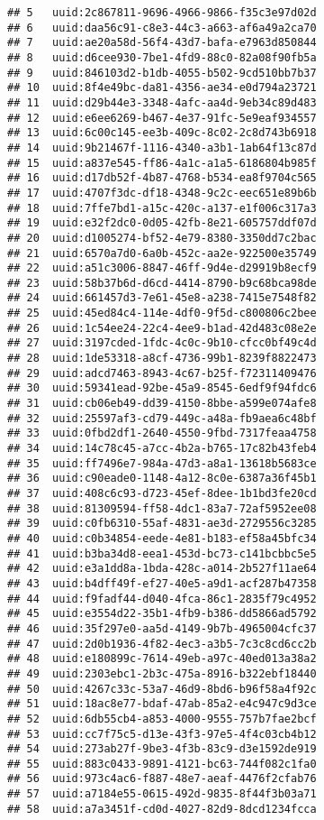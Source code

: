 \documentclass[
]{article}
\begin{document}
\begin{verbatim}
## 5   uuid:2c867811-9696-4966-9866-f35c3e97d02d
## 6   uuid:daa56c91-c8e3-44c3-a663-af6a49a2ca70
## 7   uuid:ae20a58d-56f4-43d7-bafa-e7963d850844
## 8   uuid:d6cee930-7be1-4fd9-88c0-82a08f90fb5a
## 9   uuid:846103d2-b1db-4055-b502-9cd510bb7b37
## 10  uuid:8f4e49bc-da81-4356-ae34-e0d794a23721
## 11  uuid:d29b44e3-3348-4afc-aa4d-9eb34c89d483
## 12  uuid:e6ee6269-b467-4e37-91fc-5e9eaf934557
## 13  uuid:6c00c145-ee3b-409c-8c02-2c8d743b6918
## 14  uuid:9b21467f-1116-4340-a3b1-1ab64f13c87d
## 15  uuid:a837e545-ff86-4a1c-a1a5-6186804b985f
## 16  uuid:d17db52f-4b87-4768-b534-ea8f9704c565
## 17  uuid:4707f3dc-df18-4348-9c2c-eec651e89b6b
## 18  uuid:7ffe7bd1-a15c-420c-a137-e1f006c317a3
## 19  uuid:e32f2dc0-0d05-42fb-8e21-605757ddf07d
## 20  uuid:d1005274-bf52-4e79-8380-3350dd7c2bac
## 21  uuid:6570a7d0-6a0b-452c-aa2e-922500e35749
## 22  uuid:a51c3006-8847-46ff-9d4e-d29919b8ecf9
## 23  uuid:58b37b6d-d6cd-4414-8790-b9c68bca98de
## 24  uuid:661457d3-7e61-45e8-a238-7415e7548f82
## 25  uuid:45ed84c4-114e-4df0-9f5d-c800806c2bee
## 26  uuid:1c54ee24-22c4-4ee9-b1ad-42d483c08e2e
## 27  uuid:3197cded-1fdc-4c0c-9b10-cfcc0bf49c4d
## 28  uuid:1de53318-a8cf-4736-99b1-8239f8822473
## 29  uuid:adcd7463-8943-4c67-b25f-f72311409476
## 30  uuid:59341ead-92be-45a9-8545-6edf9f94fdc6
## 31  uuid:cb06eb49-dd39-4150-8bbe-a599e074afe8
## 32  uuid:25597af3-cd79-449c-a48a-fb9aea6c48bf
## 33  uuid:0fbd2df1-2640-4550-9fbd-7317feaa4758
## 34  uuid:14c78c45-a7cc-4b2a-b765-17c82b43feb4
## 35  uuid:ff7496e7-984a-47d3-a8a1-13618b5683ce
## 36  uuid:c90eade0-1148-4a12-8c0e-6387a36f45b1
## 37  uuid:408c6c93-d723-45ef-8dee-1b1bd3fe20cd
## 38  uuid:81309594-ff58-4dc1-83a7-72af5952ee08
## 39  uuid:c0fb6310-55af-4831-ae3d-2729556c3285
## 40  uuid:c0b34854-eede-4e81-b183-ef58a45bfc34
## 41  uuid:b3ba34d8-eea1-453d-bc73-c141bcbbc5e5
## 42  uuid:e3a1dd8a-1bda-428c-a014-2b527f11ae64
## 43  uuid:b4dff49f-ef27-40e5-a9d1-acf287b47358
## 44  uuid:f9fadf44-d040-4fca-86c1-2835f79c4952
## 45  uuid:e3554d22-35b1-4fb9-b386-dd5866ad5792
## 46  uuid:35f297e0-aa5d-4149-9b7b-4965004cfc37
## 47  uuid:2d0b1936-4f82-4ec3-a3b5-7c3c8cd6cc2b
## 48  uuid:e180899c-7614-49eb-a97c-40ed013a38a2
## 49  uuid:2303ebc1-2b3c-475a-8916-b322ebf18440
## 50  uuid:4267c33c-53a7-46d9-8bd6-b96f58a4f92c
## 51  uuid:18ac8e77-bdaf-47ab-85a2-e4c947c9d3ce
## 52  uuid:6db55cb4-a853-4000-9555-757b7fae2bcf
## 53  uuid:cc7f75c5-d13e-43f3-97e5-4f4c03cb4b12
## 54  uuid:273ab27f-9be3-4f3b-83c9-d3e1592de919
## 55  uuid:883c0433-9891-4121-bc63-744f082c1fa0
## 56  uuid:973c4ac6-f887-48e7-aeaf-4476f2cfab76
## 57  uuid:a7184e55-0615-492d-9835-8f44f3b03a71
## 58  uuid:a7a3451f-cd0d-4027-82d9-8dcd1234fcca

\end{verbatim}
\end{document}
